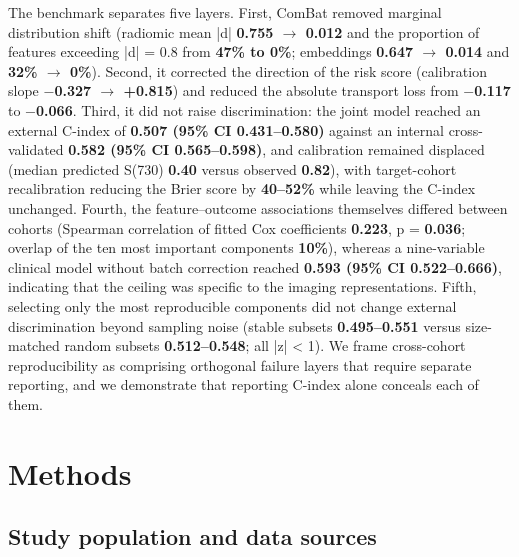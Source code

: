 \documentclass[a4paper,fleqn]{cas-sc}
\begin{document}
The benchmark separates five layers. First, ComBat removed marginal distribution shift (radiomic mean |d| \textbf{0.755 $\rightarrow$ 0.012} and the proportion of features exceeding |d| = 0.8 from \textbf{47\% to 0\%}; embeddings \textbf{0.647 $\rightarrow$ 0.014} and \textbf{32\% $\rightarrow$ 0\%}). Second, it corrected the direction of the risk score (calibration slope \textbf{$-$0.327 $\rightarrow$ +0.815}) and reduced the absolute transport loss from \textbf{$-$0.117} to \textbf{$-$0.066}. Third, it did not raise discrimination: the joint model reached an external C-index of \textbf{0.507 (95\% CI 0.431--0.580)} against an internal cross-validated \textbf{0.582 (95\% CI 0.565--0.598)}, and calibration remained displaced (median predicted S(730) \textbf{0.40} versus observed \textbf{0.82}), with target-cohort recalibration reducing the Brier score by \textbf{40--52\%} while leaving the C-index unchanged. Fourth, the feature--outcome associations themselves differed between cohorts (Spearman correlation of fitted Cox coefficients \textbf{0.223}, p = \textbf{0.036}; overlap of the ten most important components \textbf{10\%}), whereas a nine-variable clinical model without batch correction reached \textbf{0.593 (95\% CI 0.522--0.666)}, indicating that the ceiling was specific to the imaging representations. Fifth, selecting only the most reproducible components did not change external discrimination beyond sampling noise (stable subsets \textbf{0.495--0.551} versus size-matched random subsets \textbf{0.512--0.548}; all |z| < 1). We frame cross-cohort reproducibility as comprising orthogonal failure layers that require separate reporting, and we demonstrate that reporting C-index alone conceals each of them.

\section{Methods}

\subsection{Study population and data sources}
\end{document}
